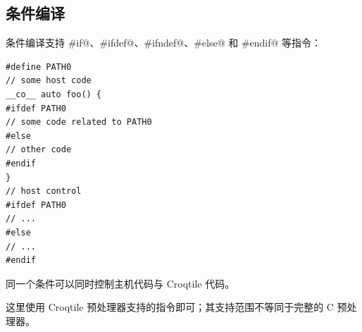 \subsection*{条件编译}

条件编译支持 \co@#if@、\co@#ifdef@、\co@#ifndef@、\co@#else@ 和 \co@#endif@ 等指令：

\begin{lstlisting}[language=croqtile,caption={条件编译}]
#define PATH0
// some host code
__co__ auto foo() {
#ifdef PATH0
// some code related to PATH0
#else
// other code
#endif
}
// host control
#ifdef PATH0
// ...
#else
// ...
#endif
\end{lstlisting}

同一个条件可以同时控制主机代码与 Croqtile 代码。

这里使用 Croqtile 预处理器支持的指令即可；其支持范围不等同于完整的 C 预处理器。
